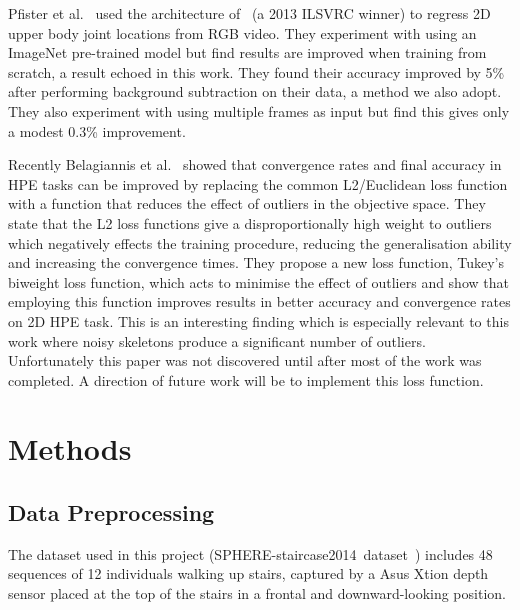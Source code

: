 \documentclass[11pt]{article} %
\begin{document}
Pfister et al.~\cite{Pfister} used the architecture of~\cite{Sermanet2013a} (a 2013 ILSVRC winner) to regress 2D upper body joint locations from RGB video. They experiment with using an ImageNet pre-trained model but find results are improved when training from scratch, a result echoed in this work. They found their accuracy improved by 5\% after performing background subtraction on their data, a method we also adopt. They also experiment with using multiple frames as input but find this gives only a modest 0.3\% improvement. 


Recently Belagiannis et al.~\cite{Belagiannis} showed that convergence rates and final accuracy in HPE tasks can be improved by replacing the common L2/Euclidean loss function with a function that reduces the effect of outliers in the objective space. They state that the L2 loss functions give a disproportionally high weight to outliers which negatively effects the training procedure, reducing the generalisation ability and increasing the convergence times. They propose a new loss function, Tukey's biweight loss function, which acts to minimise the effect of outliers and show that employing this function improves results in better accuracy and convergence rates on 2D HPE task. This is an interesting finding which is especially relevant to this work where noisy skeletons produce a significant number of outliers. Unfortunately this paper was not discovered until after most of the work was completed. A direction of future work will be to implement this loss function.






\section{Methods}
\label{sec:methods}

\subsection{Data Preprocessing}
\label{sec:preprocessing}

The dataset used in this project (SPHERE-staircase2014~dataset~\cite{Paiement}) includes 48 sequences of 12 individuals walking up stairs, captured by a Asus Xtion depth sensor placed at the top of the stairs in a frontal and downward-looking position.
\end{document}
